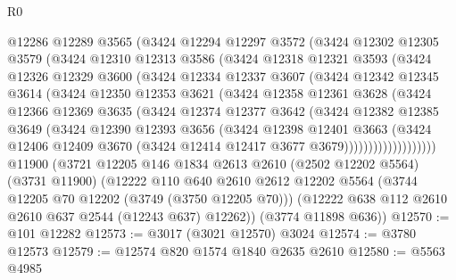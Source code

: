 \begin{lexlean}{R0}
\begin{coremodule}
          @12286
          @12289
          @3565
          (@3424
            @12294
            @12297
            @3572
            (@3424
              @12302
              @12305
              @3579
              (@3424
                @12310
                @12313
                @3586
                (@3424
                  @12318
                  @12321
                  @3593
                  (@3424
                    @12326
                    @12329
                    @3600
                    (@3424
                      @12334
                      @12337
                      @3607
                      (@3424
                        @12342
                        @12345
                        @3614
                        (@3424
                          @12350
                          @12353
                          @3621
                          (@3424
                            @12358
                            @12361
                            @3628
                            (@3424
                              @12366
                              @12369
                              @3635
                              (@3424
                                @12374
                                @12377
                                @3642
                                (@3424
                                  @12382
                                  @12385
                                  @3649
                                  (@3424
                                    @12390
                                    @12393
                                    @3656
                                    (@3424
                                      @12398
                                      @12401
                                      @3663
                                      (@3424
                                        @12406
                                        @12409
                                        @3670
                                        (@3424 @12414 @12417 @3677 @3679)))))))))))))))))))
    @11900
    (@3721
      @12205
      @146
      @1834
      @2613
      @2610
      (@2502 @12202 @5564)
      (@3731 @11900)
      (@12222
        @110
        @640
        @2610
        @2612
        @12202
        @5564
        (@3744 @12205 @70 @12202 (@3749 (@3750 @12205 @70)))
        (@12222 @638 @112 @2610 @2610 @637 @2544 (@12243 @637) @12262))
      (@3774 @11898 @636))
@12570 := @101 @12282
@12573 := @3017 (@3021 @12570) @3024
@12574 := @3780 @12573
@12579 := @12574 @820 @1574 @1840 @2635 @2610
@12580 := @5563 @4985

\end{coremodule}
\end{lexlean}
